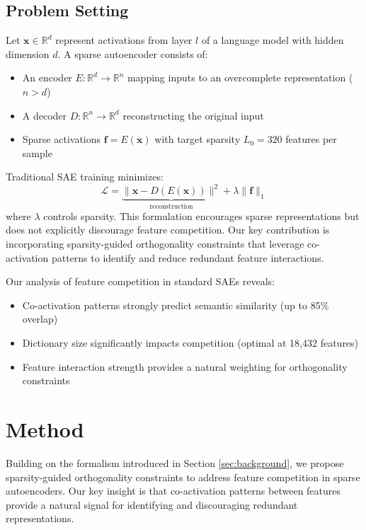 \documentclass{article} %
\begin{document}
\subsection{Problem Setting}
Let $\mathbf{x} \in \mathbb{R}^d$ represent activations from layer $l$ of a language model with hidden dimension $d$. A sparse autoencoder consists of:
\begin{itemize}
    \item An encoder $E: \mathbb{R}^d \rightarrow \mathbb{R}^n$ mapping inputs to an overcomplete representation ($n > d$)
    \item A decoder $D: \mathbb{R}^n \rightarrow \mathbb{R}^d$ reconstructing the original input
    \item Sparse activations $\mathbf{f} = E(\mathbf{x})$ with target sparsity $L_0 = 320$ features per sample
\end{itemize}

Traditional SAE training minimizes:
\begin{equation}
    \mathcal{L} = \underbrace{\|\mathbf{x} - D(E(\mathbf{x}))\|^2}_\text{reconstruction} + \lambda\|\mathbf{f}\|_1
\end{equation}
where $\lambda$ controls sparsity. This formulation encourages sparse representations but does not explicitly discourage feature competition. Our key contribution is incorporating sparsity-guided orthogonality constraints that leverage co-activation patterns to identify and reduce redundant feature interactions.

Our analysis of feature competition in standard SAEs reveals:
\begin{itemize}
    \item Co-activation patterns strongly predict semantic similarity (up to 85\% overlap)
    \item Dictionary size significantly impacts competition (optimal at 18,432 features)
    \item Feature interaction strength provides a natural weighting for orthogonality constraints
\end{itemize}

\section{Method}
\label{sec:method}

Building on the formalism introduced in Section \ref{sec:background}, we propose sparsity-guided orthogonality constraints to address feature competition in sparse autoencoders. Our key insight is that co-activation patterns between features provide a natural signal for identifying and discouraging redundant representations.
\end{document}
